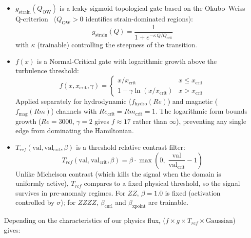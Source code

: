 \documentclass[12pt, a4paper, oneside]{report}
\begin{document}
\begin{itemize}
    \item $g_{\text{strain}}(Q_{\text{OW}})$ is a leaky sigmoid topological gate based on the Okubo--Weiss Q-criterion~\cite{okubo1970, weiss1991} ($Q_{\text{OW}} > 0$ identifies strain-dominated regions):
    \begin{equation}
        g_{\text{strain}}(Q) = \frac{1}{1 + e^{-\kappa \, Q / Q_{\text{crit}}}}
    \end{equation}
    with $\kappa$ (trainable) controlling the steepness of the transition.
    \item $f(x)$ is a Normal-Critical gate with logarithmic growth above the turbulence threshold:
    \begin{equation}
        f(x, x_{\text{crit}}, \gamma) = \begin{cases} x / x_{\text{crit}} & x \leq x_{\text{crit}} \\ 1 + \gamma \ln(x / x_{\text{crit}}) & x > x_{\text{crit}} \end{cases}
    \end{equation}
    Applied separately for hydrodynamic ($f_{\text{hydro}}(Re)$) and magnetic ($f_{\text{mag}}(Rm)$) channels with $Re_{\text{crit}} = Rm_{\text{crit}} = 1$. The logarithmic form bounds growth ($Re = 3000$, $\gamma = 2$ gives $f \approx 17$ rather than $\infty$), preventing any single edge from dominating the Hamiltonian.
    \item $T_{rcf}(\text{val}, \text{val}_{\text{crit}}, \beta)$ is a threshold-relative contrast filter:
    \begin{equation}
        T_{rcf}(\text{val}, \text{val}_{\text{crit}}, \beta) = \beta \cdot \max\!\left(0,\; \frac{\text{val}}{\text{val}_{\text{crit}}} - 1\right)
    \end{equation}
    Unlike Michelson contrast (which kills the signal when the domain is uniformly active), $T_{rcf}$ compares to a fixed physical threshold, so the signal survives in pre-anomaly regimes. For $ZZ$, $\beta = 1.0$ is fixed (activation controlled by $\sigma$); for $ZZZZ$, $\beta_{\text{curl}}$ and $\beta_{\text{xpoint}}$ are trainable.
\end{itemize}
Depending on the characteristics of our physics flux, ($f \times g \times T_{rcf} \times \text{Gaussian}$) gives:
\end{document}
